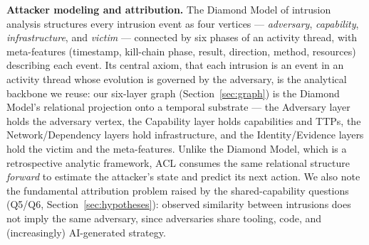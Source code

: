 \documentclass[preprints,article,accept,oneauthor]{Definitions/mdpi}
\begin{document}
\textbf{Attacker modeling and attribution.} The Diamond Model of intrusion
analysis \citep{diamond} structures every intrusion event as four vertices
--- \textit{adversary}, \textit{capability}, \textit{infrastructure}, and
\textit{victim} --- connected by six phases of an activity thread, with
meta-features (timestamp, kill-chain phase, result, direction, method,
resources) describing each event. Its central axiom, that each intrusion is
an event in an activity thread whose evolution is governed by the adversary,
is the analytical backbone we reuse: our six-layer graph
(Section~\ref{sec:graph}) is the Diamond Model's relational projection onto a
temporal substrate --- the Adversary layer holds the adversary vertex, the
Capability layer holds capabilities and TTPs, the Network/Dependency layers
hold infrastructure, and the Identity/Evidence layers hold the victim and
the meta-features. Unlike the Diamond Model, which is a retrospective
analytic framework, ACL consumes the same relational structure
\textit{forward} to estimate the attacker's state and predict its next
action. We also note the fundamental attribution problem raised by the
shared-capability questions (Q5/Q6, Section~\ref{sec:hypotheses}): observed
similarity between intrusions does not imply the same adversary, since
adversaries share tooling, code, and (increasingly) AI-generated strategy.
\end{document}
